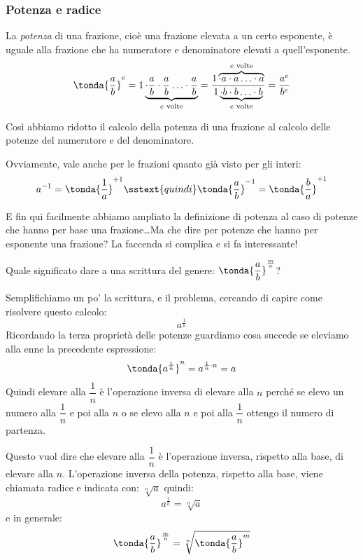 \subsubsection{Potenza e radice}

\begin{definizione}{}{}
La \emph{potenza} di una frazione, cioè 
una frazione elevata a un certo 
esponente, è uguale alla frazione che ha numeratore e denominatore elevati 
a quell'esponente.
\[\tonda{\dfrac{a}{b}}^e = 
 1 \underbrace{\cdot \dfrac{a}{b} \cdot \dfrac{a}{b} \ldots \cdot 
               \dfrac{a}{b}}_{e \text{ volte}} = 
 \dfrac{1 \overbrace{\cdot a \cdot a \ldots \cdot a }^{e \text{ volte}}}
       {1 \underbrace{\cdot b \cdot b \ldots \cdot b }_{e \text{ volte}}} = 
\dfrac{a^e}{b^e}\]
\end{definizione}
Così abbiamo ridotto il calcolo della potenza di una frazione al calcolo 
delle potenze del numeratore e del denominatore.

\begin{osservazione}{}{}
Ovviamente, vale anche per le frazioni quanto già visto per gli interi: 
\[a^{-1} = \tonda{\dfrac{1}{a}}^{+1} \sstext{quindi} 
  \tonda{\dfrac{a}{b}}^{-1} = \tonda{\dfrac{b}{a}}^{+1}\]
\end{osservazione}

E fin qui facilmente abbiamo ampliato la definizione di potenza al caso di 
potenze che hanno per base una frazione\dots Ma che dire per potenze che 
hanno per esponente una frazione? La faccenda si complica e si fa interessante!

Quale significato dare a una scrittura del genere: 
\(\tonda{\dfrac{a}{b}}^{\frac{m}{n}}\)?

Semplifichiamo un po' la scrittura, e il problema, cercando di capire come 
risolvere questo calcolo:
\[a^{\frac{1}{n}}\]
Ricordando la terza proprietà delle potenze guardiamo cosa succede se 
eleviamo alla enne la precedente espressione:
\[\tonda{a^{\frac{1}{n}}}^n = a^{\frac{1}{n} \cdot n} = a\]
Quindi elevare alla \(\dfrac{1}{n}\) è l'operazione inversa di elevare alla 
\(n\) perché se elevo un numero alla \(\dfrac{1}{n}\) e poi alla \(n\) o se 
elevo alla \(n\) e poi alla \(\dfrac{1}{n}\) ottengo il numero di partenza.

Questo vuol dire che elevare alla \(\dfrac{1}{n}\) è l'operazione inversa, 
rispetto alla base, di elevare alla \(n\). 
L'operazione inversa della potenza, rispetto alla base, viene 
chiamata 
radice e indicata con: \(\sqrt[n]{a}\) quindi:
\[a^{\frac{1}{n}} = \sqrt[n]{a}\]
e in generale:
\[\tonda{\frac{a}{b}}^{\frac{m}{n}} = \sqrt[n]{\tonda{\frac{a}{b}}^m}\]

